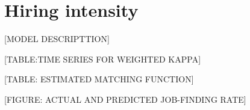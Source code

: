 \section{Hiring intensity}
\label{sec:hiring_intensity}

[MODEL DESCRIPTTION]



[TABLE:TIME SERIES FOR WEIGHTED KAPPA]

[TABLE: ESTIMATED MATCHING FUNCTION]

[FIGURE: ACTUAL AND PREDICTED JOB-FINDING RATE]
